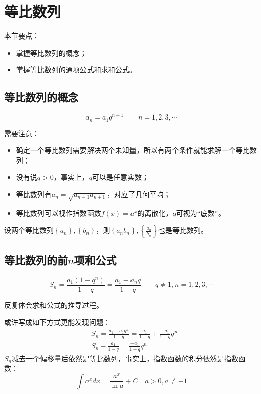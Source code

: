 \section{等比数列}

本节要点：
\begin{itemize}
    \item 掌握等比数列的概念；
    \item 掌握等比数列的通项公式和求和公式。
\end{itemize}

\subsection{等比数列的概念}

\[
a_n=a_1q^{n-1} \qquad n=1,2,3,\cdots
\]

需要注意：
\begin{itemize}
    \item 确定一个等比数列需要解决两个未知量，所以有两个条件就能求解一个等比数列；
    \item 没有说$q>0$，事实上，$q$可以是任意实数；
    \item 等比数列有$a_n=\sqrt{a_{n-1}a_{n+1}}$，对应了几何平均；
    \item 等比数列可以视作指数函数$f\left( x \right) =a^x$的离散化，$q$可视为“底数”。
\end{itemize}

\begin{theorem}
设两个等比数列$\left\{ a_n \right\} ,\left\{ b_n \right\} $，则$\left\{ a_nb_n \right\} ,\left\{ \frac{a_n}{b_n} \right\} $也是等比数列。
\end{theorem}

\subsection{等比数列的前\texorpdfstring{$n$}{n}项和公式}

\[
S_n=\frac{a_1\left( 1-q^n \right)}{1-q}=\frac{a_1-a_nq}{1-q} \qquad q\ne 1,n=1,2,3,\cdots
\]

\begin{tcolorbox}
反复体会求和公式的推导过程。
\end{tcolorbox}

或许写成如下方式更能发现问题：
\begin{align*}
&S_n=\frac{a_1-a_1q^n}{1-q}=\frac{a_1}{1-q}+\frac{-a_1}{1-q}q^n \\
&S_n-\frac{a_1}{1-q}=\frac{-a_1}{1-q}q^n
\end{align*}
$S_n$减去一个偏移量后依然是等比数列，事实上，指数函数的积分依然是指数函数：
\[
\int{a^xdx}=\frac{a^x}{\ln a}+C \quad a>0,a\ne -1
\]


